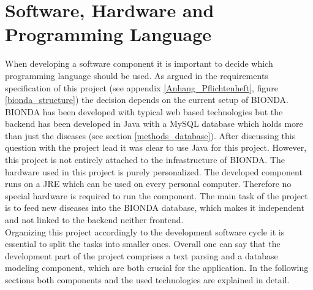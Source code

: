 \section{Software, Hardware and Programming Language}
When developing a software component it is important to decide which programming language should be used. As argued in the requirements specification of this project (see appendix \ref{Anhang_Pflichtenheft}, figure \ref{bionda_structure}) the decision depends on the current setup of \ac{BIONDA}. \ac{BIONDA} has been developed with typical web based technologies but the backend has been developed in Java \citep{Liguori_Liguori_2018} with a MySQL \citep{DuBois2014} database which holds more than just the diseases (see section \ref{methods_database}). After discussing this question with the project lead it was clear to use Java for this project. However, this project is not entirely attached to the infrastructure of \ac{BIONDA}. The hardware used in this project is purely personalized. The developed component runs on a \ac{JRE} which can be used on every personal computer. Therefore no special hardware is required to run the component. The main task of the project is to feed new diseases into the \ac{BIONDA} database, which makes it independent and not linked to the backend neither frontend. \\

Organizing this project accordingly to the development software cycle it is essential to split the tasks into smaller ones. Overall one can say that the development part of the project comprises a text parsing and a database modeling component, which are both crucial for the application. In the following sections both components and the used technologies are explained in detail.

